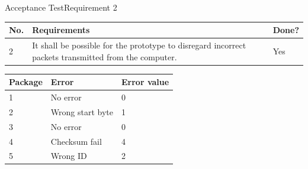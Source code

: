 \begin{frame}{Acceptance Test}{Requirement 2}

\begin{table}[H] \centering
\begin{tabular}{|p{0.5cm}| p{7cm} |p{1cm}|}
\hline%
\textbf{No.}  &  \textbf{Requirements}    & \textbf{Done?}     \\ 
\hline
2 & It shall be possible for the prototype to disregard incorrect packets transmitted from the computer. & Yes \\ 
\hline
\end{tabular}
\end{table}

  \pause

\begin{table}[H]
\centering
\begin{tabular}{|p{2cm}|p{3cm}|p{2cm}|}
\hline
Package & Error & Error value \\
\hline
1 & No error & 0 \\
\hline
2 & Wrong start byte & 1 \\
\hline
3 & No error & 0 \\
\hline
4 & Checksum fail & 4 \\
\hline
5 & Wrong ID & 2 \\
\hline
\end{tabular}
\end{table}

\end{frame}



